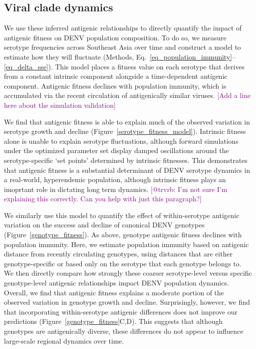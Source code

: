\documentclass[11pt,oneside,letterpaper]{article}
\def\sbc#1{\textcolor{purple}{[#1]}}
\begin{document}
\subsection*{Viral clade dynamics}
We use these inferred antigenic relationships to directly quantify the impact of antigenic fitness on DENV population composition.
To do so, we measure serotype frequencies across Southeast Asia over time and construct a model to estimate how they will fluctuate (Methods, Eq.~\ref{eq_population_immunity}--\ref{eq_delta_sse}).
This model places a fitness value on each serotype that derives from a constant intrinsic component alongside a time-dependent antigenic component.
Antigenic fitness declines with population immunity, which is accumulated via the recent circulation of antigenically similar viruses.
\sbc{Add a line here about the simulation validation}

We find that antigenic fitness is able to explain much of the observed variation in serotype growth and decline (Figure~\ref{serotype_fitness_model}).
Intrinsic fitness alone is unable to explain serotype fluctuations, although forward simulations under the optimized parameter set display damped oscillations around the serotype-specific `set points' determined by intrinsic fitnesses.
This demonstrates that antigenic fitness is a substantial determinant of DENV serotype dynamics in a real-world, hyperendemic population, although intrinsic fitness plays an imoprtant role in dictating long term dynamics.
\sbc{@trvrb: I'm not sure I'm explaining this correctly. Can you help with just this paragraph?}

We similarly use this model to quantify the effect of within-serotype antigenic variation on the success and decline of canonical DENV genotypes (Figure~\ref{genotype_fitness}).
As above, genotype antigenic fitness declines with population immunity.
Here, we estimate population immunity based on antigenic distance from recently circulating genotypes, using distances that are either genotype-specific or based only on the serotype that each genotype belongs to.
We then directly compare how strongly these coarser serotype-level versus specific genotype-level antigenic relationships impact DENV population dynamics.
Overall, we find that antigenic fitness explains a moderate portion of the observed variation in genotype growth and decline.
Surprisingly, however, we find that incorporating within-serotype antigenic differences does not improve our predictions (Figure~\ref{genotype_fitness}C,D).
This suggests that although genotypes are antigenically diverse, these differences do not appear to influence large-scale regional dynamics over time.
\end{document}
